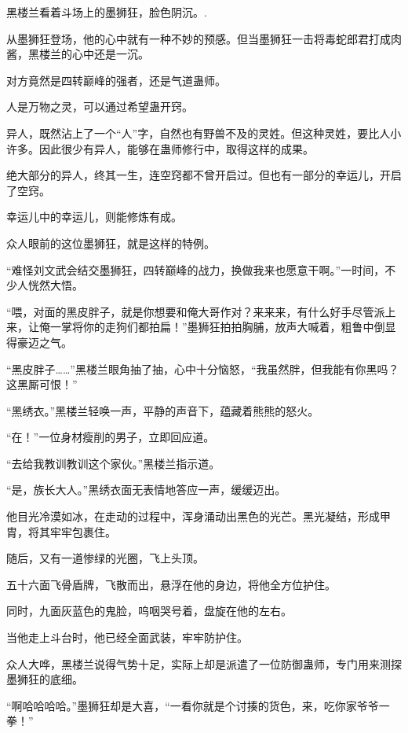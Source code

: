 
\begin{this_body}

黑楼兰看着斗场上的墨狮狂，脸色阴沉。.

从墨狮狂登场，他的心中就有一种不妙的预感。但当墨狮狂一击将毒蛇郎君打成肉酱，黑楼兰的心中还是一沉。

对方竟然是四转巅峰的强者，还是气道蛊师。

人是万物之灵，可以通过希望蛊开窍。

异人，既然沾上了一个“人”字，自然也有野兽不及的灵姓。但这种灵姓，要比人小许多。因此很少有异人，能够在蛊师修行中，取得这样的成果。

绝大部分的异人，终其一生，连空窍都不曾开启过。但也有一部分的幸运儿，开启了空窍。

幸运儿中的幸运儿，则能修炼有成。

众人眼前的这位墨狮狂，就是这样的特例。

“难怪刘文武会结交墨狮狂，四转巅峰的战力，换做我来也愿意干啊。”一时间，不少人恍然大悟。

“喂，对面的黑皮胖子，就是你想要和俺大哥作对？来来来，有什么好手尽管派上来，让俺一掌将你的走狗们都拍扁！”墨狮狂拍拍胸脯，放声大喊着，粗鲁中倒显得豪迈之气。

“黑皮胖子……”黑楼兰眼角抽了抽，心中十分恼怒，“我虽然胖，但我能有你黑吗？这黑厮可恨！”

“黑绣衣。”黑楼兰轻唤一声，平静的声音下，蕴藏着熊熊的怒火。

“在！”一位身材瘦削的男子，立即回应道。

“去给我教训教训这个家伙。”黑楼兰指示道。

“是，族长大人。”黑绣衣面无表情地答应一声，缓缓迈出。

他目光冷漠如冰，在走动的过程中，浑身涌动出黑色的光芒。黑光凝结，形成甲胄，将其牢牢包裹住。

随后，又有一道惨绿的光圈，飞上头顶。

五十六面飞骨盾牌，飞散而出，悬浮在他的身边，将他全方位护住。

同时，九面灰蓝色的鬼脸，呜咽哭号着，盘旋在他的左右。

当他走上斗台时，他已经全面武装，牢牢防护住。

众人大哗，黑楼兰说得气势十足，实际上却是派遣了一位防御蛊师，专门用来测探墨狮狂的底细。

“啊哈哈哈哈。”墨狮狂却是大喜，“一看你就是个讨揍的货色，来，吃你家爷爷一拳！”


\end{this_body}

